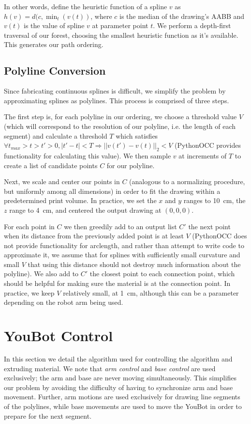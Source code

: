 \documentclass[conference]{acmsiggraph}
\begin{document}
In other words, define the heuristic function of a spline $v$ as $h(v) = d(c, \min_t(v(t))$, where $c$ is the median of the drawing's AABB and $v(t)$ is the value of spline $v$ at parameter point $t$.  We perform a depth-first traversal of our forest, choosing the smallest heuristic function as it's available.  This generates our path ordering.


\subsection{Polyline Conversion}
Since fabricating continuous splines is difficult, we simplify the problem by approximating splines as polylines.  This process is comprised of three steps.

The first step is, for each polyline in our ordering, we choose a threshold value $V$ (which will correspond to the resolution of our polyline, i.e. the length of each segment) and calculate a threshold $T$ which satisfies $\forall t_{max} > t > t' > 0, |t' - t| < T \Rightarrow ||v(t') - v(t)||_2 < V$ (PythonOCC provides functionality for calculating this value).  We then sample $v$ at increments of $T$ to create a list of candidate points $C$ for our polyline.  

Next, we scale and center our points in $C$ (analogous to a normalizing procedure, but uniformly among all dimensions) in order to fit the drawing within a predetermined print volume.  In practice, we set the $x$ and $y$ ranges to 10~cm, the $z$ range to 4~cm, and centered the output drawing at $(0, 0, 0)$.

For each point in $C$ we then greedily add to an output list $C'$ the next point when its distance from the previously added point is at least $V$ (PythonOCC does not provide functionality for arclength, and rather than attempt to write code to approximate it, we assume that for splines with sufficiently small curvature and small $V$ that using this distance should not destroy much information about the polyline).  We also add to $C'$ the closest point to each connection point, which should be helpful for making sure the material is at the connection point.  In practice, we keep $V$ relatively small, at 1~cm, although this can be a parameter depending on the robot arm being used.

\section{YouBot Control}

In this section we detail the algorithm used for controlling the algorithm and extruding material.  We note that \emph{arm control} and \emph{base control} are used exclusively; the arm and base are never moving simultaneously.  This simplifies our problem by avoiding the difficulty of having to synchronize arm and base movement.  Further, arm motions are used exclusively for drawing line segments of the polylines, while base movements are used to move the YouBot in order to prepare for the next segment.  
\end{document}
